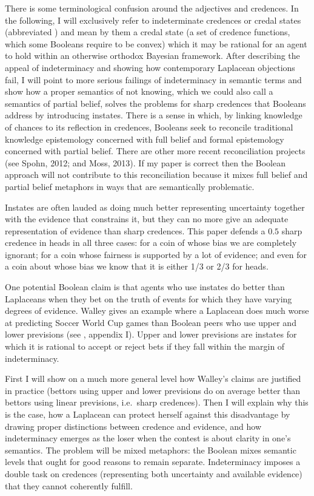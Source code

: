 \documentclass[11pt]{article}
\begin{document}
There is some terminological confusion around the adjectives
  and  credences.
In the following, I will exclusively refer to indeterminate credences
or credal states (abbreviated ) and mean by them a
credal state (a set of credence functions, which some Booleans require
to be convex) which it may be rational for an agent to hold within an
otherwise orthodox Bayesian framework. After describing the appeal of
indeterminacy and showing how contemporary Laplacean objections fail,
I will point to more serious failings of indeterminacy in semantic
terms and show how a proper semantics of not knowing, which we could
also call a semantics of partial belief, solves the problems for sharp
credences that Booleans address by introducing instates. There is a
sense in which, by linking knowledge of chances to its reflection in
credences, Booleans seek to reconcile traditional knowledge
epistemology concerned with full belief and formal epistemology
concerned with partial belief. There are other more recent
reconciliation projects (see Spohn, 2012; and Moss, 2013). If my paper
is correct then the Boolean approach will not contribute to this
reconciliation because it mixes full belief and partial belief
metaphors in ways that are semantically problematic.

Instates are often lauded as doing much better representing
uncertainty together with the evidence that constrains it, but they
can no more give an adequate representation of evidence than sharp
credences. This paper defends a $0.5$ sharp credence in heads in all
three cases: for a coin of whose bias we are completely ignorant; for
a coin whose fairness is supported by a lot of evidence; and even for
a coin about whose bias we know that it is either 1/3 or 2/3 for
heads.

One potential Boolean claim is that agents who use instates do better
than Laplaceans when they bet on the truth of events for which they
have varying degrees of evidence. Walley gives an example where a
Laplacean does much worse at predicting Soccer World Cup games than
Boolean peers who use upper and lower previsions (see
, appendix I). Upper and lower previsions are
instates for which it is rational to accept or reject bets if they
fall within the margin of indeterminacy.

First I will show on a much more general level how Walley's claims are
justified in practice (bettors using upper and lower previsions do on
average better than bettors using linear previsions, i.e.\ sharp
credences). Then I will explain why this is the case, how a Laplacean
can protect herself against this disadvantage by drawing proper
distinctions between credence and evidence, and how indeterminacy
emerges as the loser when the contest is about clarity in one's
semantics. The problem will be mixed metaphors: the Boolean mixes
semantic levels that ought for good reasons to remain separate.
Indeterminacy imposes a double task on credences (representing both
uncertainty and available evidence) that they cannot coherently
fulfill.
\end{document}
